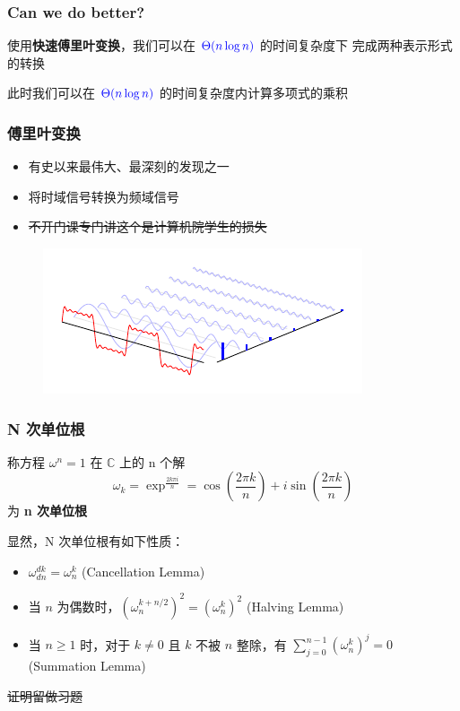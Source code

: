 \documentclass[UTF8]{ctexbeamer}
\begin{document}
\begin{frame}
    \frametitle{Can we do better?}
    使用\textbf{快速傅里叶变换}，我们可以在
    $\textcolor{blue}{\Theta(n \log n)}$ 的时间复杂度下
    完成两种表示形式的转换
 
    此时我们可以在 $\textcolor{blue}{\Theta(n \log n)}$
    的时间复杂度内计算多项式的乘积
\end{frame}

\begin{frame}
    \frametitle{傅里叶变换}
    \begin{itemize}
        \item 有史以来最伟大、最深刻的发现之一
        \item 将时域信号转换为频域信号
        \item \sout{不开门课专门讲这个是计算机院学生的损失}
    \end{itemize}
    \begin{figure}
        \includegraphics[width= 0.8\linewidth]{ft.pdf}
     \end{figure}
\end{frame}

\begin{frame}
    \frametitle{N 次单位根}
    \begin{block}{}
        称方程 $\omega^n = 1$ 在 $\mathbb{C}$ 上的 n 个解
        $$\omega_k = \exp^{\frac{2k\pi i}{n}} = \cos(\frac{2\pi k}{n}) + i \sin(\frac{2\pi k}{n})$$
        为 \textbf{n 次单位根}
    \end{block}
    显然，N 次单位根有如下性质：
    \begin{itemize}
        \item $\omega_{dn}^{dk} = \omega_{n}^{k}$ (Cancellation Lemma)
        \item 当 $n$ 为偶数时，$(\omega_n^{k + n/2})^2 = (\omega_n^k)^2$ (Halving Lemma)
        \item 当 $n \geq 1$ 时，对于 $k \neq 0$ 且 $k$ 不被 $n$ 整除，有 
        $\sum_{j = 0}^{n - 1} (\omega_n^k)^j = 0$ (Summation Lemma)
    \end{itemize}
    \begin{center}
        \sout{证明留做习题}
    \end{center}
\end{frame}
\end{document}
